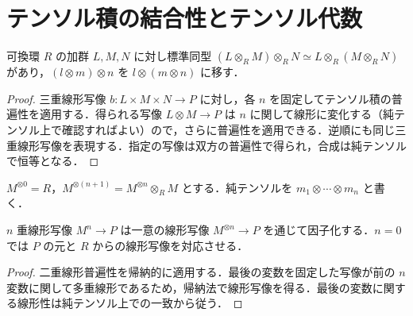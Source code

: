 \section{テンソル積の結合性とテンソル代数}
\begin{prop}[テンソル積の結合同型]
可換環 $R$ の加群 $L,M,N$ に対し標準同型 $(L\otimes_R M)\otimes_R N\simeq L\otimes_R(M\otimes_R N)$ があり，$(l\otimes m)\otimes n$ を $l\otimes(m\otimes n)$ に移す．
\end{prop}
\begin{proof}
三重線形写像 $b:L\times M\times N\to P$ に対し，各 $n$ を固定してテンソル積の普遍性を適用する．得られる写像 $L\otimes M\to P$ は $n$ に関して線形に変化する（純テンソル上で確認すればよい）ので，さらに普遍性を適用できる．逆順にも同じ三重線形写像を表現する．指定の写像は双方の普遍性で得られ，合成は純テンソルで恒等となる．
\end{proof}
\begin{defn}[テンソル冪]
$M^{\otimes0}=R$，$M^{\otimes(n+1)}=M^{\otimes n}\otimes_R M$ とする．純テンソルを $m_1\otimes\cdots\otimes m_n$ と書く．
\end{defn}
\begin{prop}[テンソル冪の多重線形普遍性]
$n$ 重線形写像 $M^n\to P$ は一意の線形写像 $M^{\otimes n}\to P$ を通じて因子化する．$n=0$ では $P$ の元と $R$ からの線形写像を対応させる．
\end{prop}
\begin{proof}
二重線形普遍性を帰納的に適用する．最後の変数を固定した写像が前の $n$ 変数に関して多重線形であるため，帰納法で線形写像を得る．最後の変数に関する線形性は純テンソル上での一致から従う．
\end{proof}
